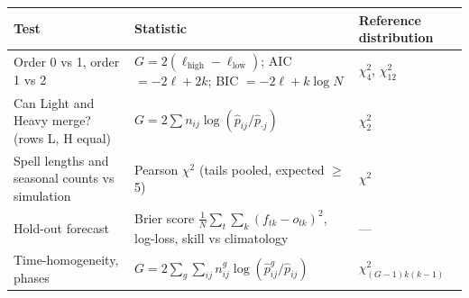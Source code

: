 \documentclass[11pt,a4paper]{article}
\begin{document}
{\def\LTcaptype{none} %

\begin{longtable}[]{@{}

  >{\raggedright\arraybackslash}p{}

  >{\raggedright\arraybackslash}p{}

  >{\raggedright\arraybackslash}p{}@{}}

\toprule\noalign{}

\begin{minipage}[b]{\linewidth}\raggedright

Test

\end{minipage} & \begin{minipage}[b]{\linewidth}\raggedright

Statistic

\end{minipage} & \begin{minipage}[b]{\linewidth}\raggedright

Reference distribution

\end{minipage} \\

\midrule\noalign{}

\endhead

\bottomrule\noalign{}

\endlastfoot

Order 0 vs 1, order 1 vs 2 & \(G=2(\ell_{\text{high}}-\ell_{\text{low}})\); AIC \(=-2\ell+2k\); BIC \(=-2\ell+k\log N\) & \(\chi^2_4\), \(\chi^2_{12}\) \\

Can Light and Heavy merge? (rows L, H equal) & \(G=2\sum n_{ij}\log(\hat p_{ij}/\hat p_{\cdot j})\) & \(\chi^2_2\) \\

Spell lengths and seasonal counts vs simulation & Pearson \(\chi^2\) (tails pooled, expected $\geq$ 5) & \(\chi^2\) \\

Hold-out forecast & Brier score \(\frac1N\sum_t\sum_k(f_{tk}-o_{tk})^2\), log-loss, skill vs climatology & --- \\

Time-homogeneity, phases & \(G=2\sum_g\sum_{ij}n^g_{ij}\log(\hat p^g_{ij}/\hat p_{ij})\) & \(\chi^2_{(G-1)k(k-1)}\) \\


\end{longtable}}
\end{document}
